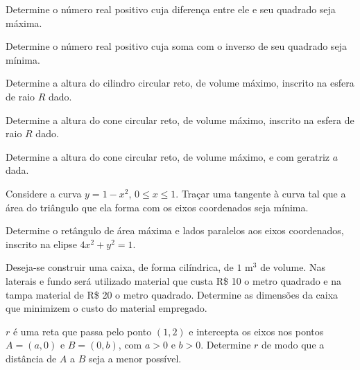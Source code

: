 \begin{exercicio}[3]
Determine o número real positivo cuja diferença entre ele e seu quadrado seja máxima.
\end{exercicio}

\begin{exercicio}[4]
Determine o número real positivo cuja soma com o inverso de seu quadrado seja mínima.
\end{exercicio}

\begin{exercicio}[5]
Determine a altura do cilindro circular reto, de volume máximo, inscrito na esfera de raio $R$ dado.
\end{exercicio}

\begin{exercicio}[6]
Determine a altura do cone circular reto, de volume máximo, inscrito na esfera de raio $R$ dado.
\end{exercicio}

\begin{exercicio}[7]
Determine a altura do cone circular reto, de volume máximo, e com geratriz $a$ dada.
\end{exercicio}

\begin{exercicio}[8]
Considere a curva $y = 1 - x^2$, $0 \le x \le 1$. Traçar uma tangente à curva tal que a área do triângulo que ela forma com os eixos coordenados seja mínima.
\end{exercicio}

\begin{exercicio}[9]
Determine o retângulo de área máxima e lados paralelos aos eixos coordenados, inscrito na elipse $4x^2 + y^2 = 1$.
\end{exercicio}

\begin{exercicio}[10]
Deseja-se construir uma caixa, de forma cilíndrica, de $1\text{ m}^3$ de volume. Nas laterais e fundo será utilizado material que custa R\$ 10 o metro quadrado e na tampa material de R\$ 20 o metro quadrado. Determine as dimensões da caixa que minimizem o custo do material empregado.
\end{exercicio}

\begin{exercicio}[11]
$r$ é uma reta que passa pelo ponto $(1, 2)$ e intercepta os eixos nos pontos $A = (a, 0)$ e $B = (0, b)$, com $a > 0$ e $b > 0$. Determine $r$ de modo que a distância de $A$ a $B$ seja a menor possível.
\end{exercicio}


